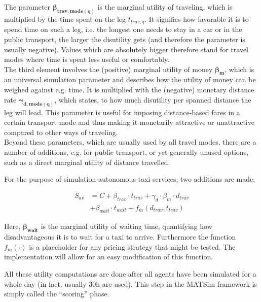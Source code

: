 The parameter $\mathbf{\beta_{trav,mode(q)}}$ is the marginal utility of traveling,
which is multiplied by the time spent on the leg $t_{trav,q}$. It signifies how
favorable it is to spend time on such a leg, i.e. the longest one needs to stay
in a car or in the public transport, the larger the disutility gets (and therefore
the parameter is usually negative). Values which are absolutely bigger therefore
stand for travel modes where time is spent less useful or comfortably.\\

The third element involves the (positive) marginal utility of money $\mathbf{\beta_{m}}$,
which is an universal simulation parameter and describes how the utility of money can
be weighed against e.g. time.
It is multiplied with the (negative) monetary distance rate
$\mathbf{\gamma_{d,mode(q)}}$, which states, to how much disutility per spanned
distance the leg will lead. This parameter is useful for imposing distance-based
fares in a certain transport mode and thus making it monetarily attractive or
unattractive compared to other ways of traveling.\\

Beyond these parameters, which are usually used by all travel modes, there are
a number of additions, e.g. for public transport, or yet generally unused options, such
as a direct marginal utility of distance travelled.

For the purpose of simulation autonomous taxi services, two additions are made:

\begin{equation}\begin{aligned}
S_{av} &= C + \beta_{trav} \cdot t_{trav} + \gamma_d \cdot \beta_m \cdot d_{trav}\\
&+ \beta_{wait} \cdot t_{wait} + f_m(d_{trav},t_{trav})
\end{aligned}\end{equation}

Here, $\mathbf{\beta_{wait}}$ is the marginal utility of waiting time, quantifying
how disadvantageous it is to wait for a taxi to arrive. Furthermore the function
$f_m(\cdot)$ is a placeholder for any pricing strategy that might be tested. The
implementation will allow for an easy modification of this function.

All these utility computations are done after all agents have been simulated for
a whole day (in fact, usually 30h are used). This step in the MATSim framework is
simply called the ``scoring'' phase.

